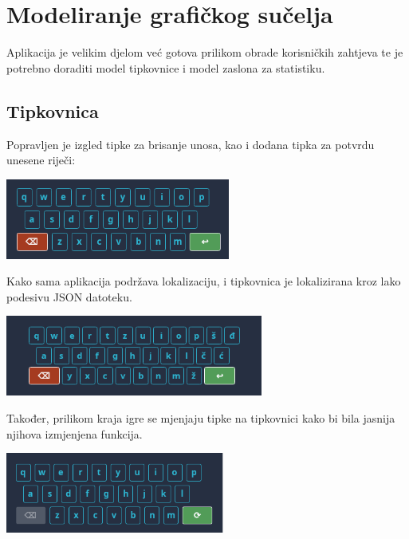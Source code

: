 \documentclass[12pt,a4paper]{report}
\begin{document}
\chapter{Modeliranje grafičkog sučelja}

Aplikacija je velikim djelom već gotova prilikom obrade korisničkih zahtjeva
te je potrebno doraditi model tipkovnice i model zaslona za statistiku.

\section{Tipkovnica}

Popravljen je izgled tipke za brisanje unosa, kao i dodana tipka za potvrdu
unesene riječi:

\smallskip
\begin{center}
    \includegraphics[height=100px,keepaspectratio]{./figures/nova_tipkovnica.png}
\end{center}
\smallskip

Kako sama aplikacija podržava lokalizaciju, i tipkovnica je lokalizirana kroz
lako podesivu JSON datoteku.

\smallskip
\begin{center}
    \includegraphics[height=100px,keepaspectratio]{./figures/nova_tipkovnica_hr.png}
\end{center}
\smallskip

Također, prilikom kraja igre se mjenjaju tipke na tipkovnici kako bi bila
jasnija njihova izmjenjena funkcija.

\smallskip
\begin{center}
    \includegraphics[height=100px,keepaspectratio]{./figures/nova_tipkovnica_1.png}
\end{center}
\smallskip
\end{document}
